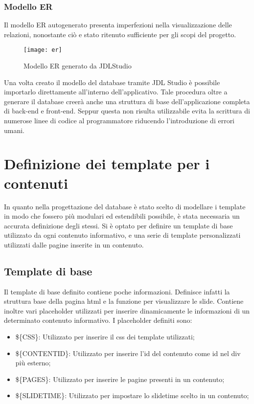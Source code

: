 \subsubsection{Modello ER}
Il modello ER autogenerato presenta imperfezioni nella visualizzazione delle relazioni, nonostante ciò e stato ritenuto sufficiente per gli scopi del progetto.
\begin{figure}[h]
    \begin{center}
    \texttt{[image: er]}
    \caption{Modello ER generato da JDLStudio}
    \label{fig:figure19}
    \end{center}
\end{figure}
Una volta creato il modello del database tramite JDL Studio è possibile importarlo direttamente all'interno dell'applicativo.
Tale procedura oltre a generare il database creerà anche una struttura di base dell'applicazione completa di back-end e front-end. Seppur questa non risulta utilizzabile evita la scrittura di numerose linee di codice al programmatore riducendo l'introduzione di errori umani.
\section{Definizione dei template per i contenuti}
In quanto nella progettazione del database è stato scelto di modellare i template in modo che fossero più modulari ed estendibili possibile, è stata necessaria un accurata definizione degli stessi. Si è optato per definire un template di base utilizzato da ogni contenuto informativo, e una serie di template personalizzati utilizzati dalle pagine inserite in un contenuto.
\subsection{Template di base}
Il template di base definito contiene poche informazioni. Definisce infatti la struttura base della pagina html e la funzione per visualizzare le slide. Contiene inoltre vari placeholder utilizzati per inserire dinamicamente le informazioni di un determinato contenuto informativo.
I placeholder definiti sono: 
\begin{itemize}
    \item \$\{CSS\}: Utilizzato per inserire il css dei template utilizzati;
    \item \$\{CONTENTID\}: Utilizzato per inserire l’id del contenuto come id nel div più esterno;
    \item \$\{PAGES\}: Utilizzato per inserire le pagine presenti in un contenuto;
    \item \$\{SLIDETIME\}: Utilizzato per impostare lo slidetime scelto in un contenuto;
\end{itemize}
